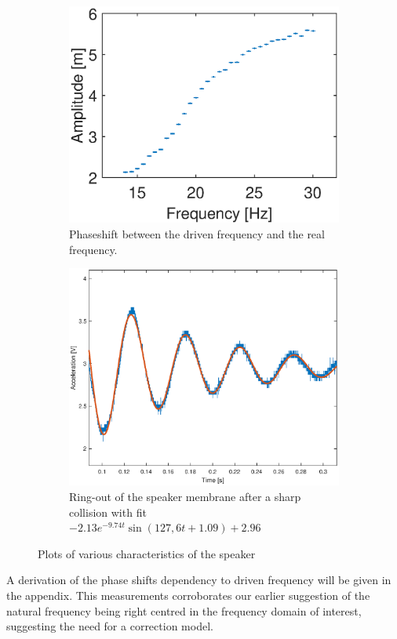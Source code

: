 \documentclass[12pt,oneside,a4paper]{article}
\numberwithin{equation}{section}
\begin{document}
{{{{\begin{figure}[h]
\begin{subfigure}[t]{0.49\textwidth}
		\includegraphics[width=\textwidth]{pshiftplot.eps} 
		\caption{Phaseshift between the driven frequency and the real frequency.}
		\label{phaseshift_plot}
	\end{subfigure} \hfill 
	\begin{subfigure}[t]{0.49\textwidth}
		\centering
		\includegraphics[width=\textwidth]{ringout.eps}
		\caption{Ring-out of the speaker membrane after a sharp collision with fit $-2.13e^{-9.74t}\sin(127,6t+1.09)+2.96$}
		\label{ringout}
	\end{subfigure}
	\caption{Plots of various characteristics of the speaker}
\end{figure}
A derivation of the phase shifts dependency to driven frequency will be given in the appendix. This measurements corroborates our earlier suggestion of the natural frequency being right centred in the frequency domain of interest, suggesting the need for a correction model. 

}}}}
\end{document}
